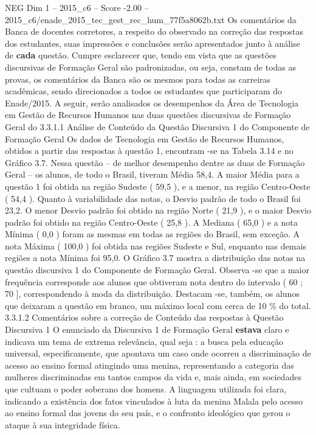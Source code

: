 \begin{textsample}{NEG Dim 1 – 2015\_c6 – Score -2.00 – 2015\_c6/enade\_2015\_tec\_gest\_rec\_hum\_77f5a8062b.txt}
Os comentários da Banca de docentes corretores, a respeito do observado na correção das respostas dos estudantes, suas impressões e conclusões serão apresentados junto à análise de \textbf{cada} questão.
Cumpre esclarecer que, tendo em vista que as questões discursivas de Formação Geral são padronizadas, ou seja, constam de todas as provas, os comentários da Banca são os mesmos para todas as carreiras acadêmicas, sendo direcionados a todos os estudantes que participaram do Enade/2015.
A seguir, serão analisados os desempenhos da Área de Tecnologia em Gestão de Recursos Humanos nas duas questões discursivas de Formação Geral do 3.3.1.1 Análise de Conteúdo da Questão Discursiva 1 do Componente de Formação Geral Os dados de Tecnologia em Gestão de Recursos Humanos, obtidos a partir das respostas à questão 1, encontram -se na Tabela 3.14 e no Gráfico 3.7.
Nessa questão – de melhor desempenho dentre as duas de Formação Geral – os alunos, de todo o Brasil, tiveram Média 58,4.
A maior Média para a questão 1 foi obtida na região Sudeste ( 59,5 ), e a menor, na região Centro-Oeste ( 54,4 ).
Quanto à variabilidade das notas, o Desvio padrão de todo o Brasil foi 23,2.
O menor Desvio padrão foi obtido na região Norte ( 21,9 ), e o maior Desvio padrão foi obtido na região Centro-Oeste ( 25,8 ).
A Mediana ( 65,0 ) e a nota Mínima ( 0,0 ) foram as mesmas em todas as regiões do Brasil, sem exceção.
A nota Máxima ( 100,0 ) foi obtida nas regiões Sudeste e Sul, enquanto nas demais regiões a nota Mínima foi 95,0.
O Gráfico 3.7 mostra a distribuição das notas na questão discursiva 1 do Componente de Formação Geral.
Observa -se que a maior frequência corresponde aos alunos que obtiveram nota dentro do intervalo ( 60 ; 70 ], correspondendo à moda da distribuição.
Destacam -se, também, os alunos que deixaram a questão em branco, um máximo local com cerca de 10 \% do total. 3.3.1.2 Comentários sobre a correção de Conteúdo das respostas à Questão Discursiva 1 O enunciado da Discursiva 1 de Formação Geral \textbf{estava} claro e indicava um tema de extrema relevância, qual seja : a busca pela educação universal, especificamente, que apontava um caso onde ocorreu a discriminação de acesso ao ensino formal atingindo uma menina, representando a categoria das mulheres discriminadas em tantos campos da vida e, mais ainda, em sociedades que cultuam o poder soberano dos homens.
A linguagem utilizada foi clara, indicando a existência dos fatos vinculados à luta da menina Malala pelo acesso ao ensino formal das jovens do seu país, e o confronto ideológico que gerou o ataque à sua integridade física.

\end{textsample}
